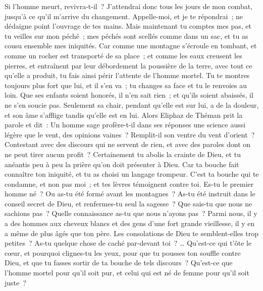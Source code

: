 \begin{multicols}{2}
Si l'homme meurt, revivra-t-il~? J'attendrai donc tous les jours de mon combat, jusqu'à ce qu'il m'arrive du changement.
 Appelle-moi, et je te répondrai~; ne dédaigne point l'ouvrage de tes mains. 
Mais maintenant tu comptes mes pas, et tu veilles sur mon péché~;
mes péchés sont scellés comme dans un sac, et tu as cousu ensemble mes iniquités.
Car comme une montagne s'écroule en tombant, et comme un rocher est transporté de sa place~; 
 et comme les eaux creusent les pierres, et entraînent par leur débordement la poussière de la terre, avec tout ce qu'elle a produit, tu fais ainsi périr l'attente de l'homme mortel.
Tu te montres toujours plus fort que lui, et il s'en va~; tu changes sa face et tu le renvoies au loin.
Que ses enfants soient honorés, il n'en sait rien~; et qu'ils soient abaissés, il ne s'en soucie pas.
Seulement sa chair, pendant qu'elle est sur lui, a de la douleur, et son âme s'afflige tandis qu'elle est en lui.
\VerseOne{}Alors Eliphaz de Théman prit la parole et dit~:
Un homme sage profère-t-il dans ses réponses une science aussi légère que le vent, des opinions vaines~? Remplit-il son ventre du vent d'orient~?
Contestant avec des discours qui ne servent de rien, et avec des paroles dont on ne peut tirer aucun profit~?
Certainement tu abolis la crainte de Dieu, et tu anéantis peu à peu la prière qu'on doit présenter à Dieu. 
 Car ta bouche fait connaître ton iniquité, et tu as choisi un langage trompeur. 
C'est ta bouche qui te condamne, et non pas moi~; et tes lèvres témoignent contre toi. 
Es-tu le premier homme né~? Ou as-tu été formé avant les montagnes~?
As-tu été instruit dans le conseil secret de Dieu, et renfermes-tu seul la sagesse~?
Que sais-tu que nous ne sachions pas~? Quelle connaissance as-tu que nous n'ayons pas~?
Parmi nous, il y a des hommes aux cheveux blancs et des gens d'une fort grande vieillesse, il y en a même de plus âgés que ton père. 
Les consolations de Dieu te semblent-elles trop petites~? As-tu quelque chose de caché par-devant toi~? …
Qu'est-ce qui t'ôte le cœur, et pourquoi clignes-tu les yeux, 
pour que tu pousses ton souffle contre Dieu, et que tu fasses sortir de ta bouche de tels discours~? 
Qu'est-ce que l'homme mortel pour qu'il soit pur, et celui qui est né de femme pour qu'il soit juste~?

\end{multicols}
